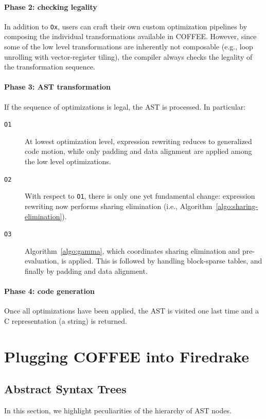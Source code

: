 \paragraph{Phase 2: checking legality}
In addition to \texttt{Ox}, users can craft their own custom optimization pipelines by composing the individual transformations available in COFFEE. However, since some of the low level transformations are inherently not composable (e.g., loop unrolling with vector-register tiling), the compiler always checks the legality of the transformation sequence. 

\paragraph{Phase 3: AST transformation}
If the sequence of optimizations is legal, the AST is processed. In particular:
\begin{description}
\item[\texttt{O1}] At lowest optimization level, expression rewriting reduces to generalized code motion, while only padding and data alignment are applied among the low level optimizations.
\item[\texttt{O2}] With respect to \texttt{O1}, there is only one yet fundamental change: expression rewriting now performs sharing elimination (i.e., Algorithm~\ref{algo:sharing-elimination}).
\item[\texttt{O3}] Algorithm~\ref{algo:gamma}, which coordinates sharing elimination and pre-evaluation, is applied. This is followed by handling block-sparse tables, and finally by padding and data alignment. 
\end{description}

\paragraph{Phase 4: code generation}
Once all optimizations have been applied, the AST is visited one last time and a C representation (a string) is returned.

\section{Plugging COFFEE into Firedrake}
\label{sec:coffee-implementation}

\subsection{Abstract Syntax Trees}
In this section, we highlight peculiarities of the hierarchy of AST nodes.

